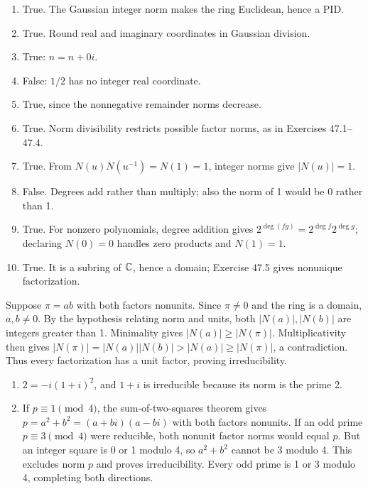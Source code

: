 \begin{enumerate}[label=(\alph*)]
\item True. The Gaussian integer norm makes the ring Euclidean, hence a PID.
\item True. Round real and imaginary coordinates in Gaussian division.
\item True: $n=n+0i$.
\item False: $1/2$ has no integer real coordinate.
\item True, since the nonnegative remainder norms decrease.
\item True. Norm divisibility restricts possible factor norms, as in Exercises 47.1--47.4.
\item True. From $N(u)N(u^{-1})=N(1)=1$, integer norms give $|N(u)|=1$.
\item False. Degrees add rather than multiply; also the norm of 1 would be 0 rather than 1.
\item True. For nonzero polynomials, degree addition gives $2^{\deg(fg)}=2^{\deg f}2^{\deg g}$; declaring $N(0)=0$ handles zero products and $N(1)=1$.
\item True. It is a subring of $\mathbb{C}$, hence a domain; Exercise 47.5 gives nonunique factorization.
\end{enumerate}

Suppose $\pi=ab$ with both factors nonunits. Since $\pi\ne0$ and the ring is a domain, $a,b\ne0$. By the hypothesis relating norm and units, both $|N(a)|,|N(b)|$ are integers greater than 1. Minimality gives $|N(a)|\ge|N(\pi)|$. Multiplicativity then gives $|N(\pi)|=|N(a)||N(b)|>|N(a)|\ge|N(\pi)|$, a contradiction. Thus every factorization has a unit factor, proving irreducibility.

\begin{enumerate}[label=(\alph*)]
\item $2=-i(1+i)^2$, and $1+i$ is irreducible because its norm is the prime 2.
\item If $p\equiv1\pmod4$, the sum-of-two-squares theorem gives $p=a^2+b^2=(a+bi)(a-bi)$ with both factors nonunits. If an odd prime $p\equiv3\pmod4$ were reducible, both nonunit factor norms would equal $p$. But an integer square is 0 or 1 modulo 4, so $a^2+b^2$ cannot be 3 modulo 4. This excludes norm $p$ and proves irreducibility. Every odd prime is 1 or 3 modulo 4, completing both directions.
\end{enumerate}

